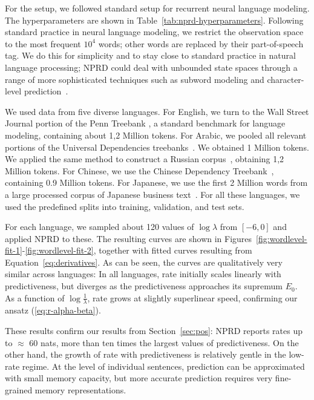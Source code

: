 \documentclass[11pt,letterpaper]{article}
\begin{document}
For the setup, we followed standard setup for recurrent neural language modeling.
The hyperparameters are shown in Table~\ref{tab:nprd-hyperparameters}.
Following standard practice in neural language modeling, we restrict the observation space to the most frequent $10^4$ words; other words are replaced by their part-of-speech tag.
We do this for simplicity and to stay close to standard practice in natural language processing; NPRD could deal with unbounded state spaces through a range of more sophisticated techniques such as subword modeling and character-level prediction~\citep{kim2016character, luong2016achieving}.


We used data from five diverse languages.
For English, we turn to the Wall Street Journal portion of the Penn Treebank \citep{marcus-building-1993}, a standard benchmark for language modeling, containing about 1,2 Million tokens.
For Arabic, we pooled all relevant portions of the Universal Dependencies treebanks~\citep{nivre-universal-2016,maamouri2004penn, hajic2004prague}. We obtained 1 Million tokens.
We applied the same method to construct a Russian corpus~\citep{syntagrus}, obtaining 1,2 Million tokens.
For Chinese, we use the Chinese Dependency Treebank~\citep{che2012chinese}, containing 0.9 Million tokens.
For Japanese, we use the first 2 Million words from a large processed corpus of Japanese business text~\citep{graff1995japanese}.
For all these languages, we used the predefined splits into training, validation, and test sets.

For each language, we sampled about 120 values of $\log \lambda$ from $[-6, 0]$ and applied NPRD to these.
The resulting curves are shown in Figures~\ref{fig:wordlevel-fit-1}-\ref{fig:wordlevel-fit-2}, together with fitted curves resulting from Equation~\ref{eq:derivatives}.
As can be seen, the curves are qualitatively very similar across languages:
In all languages, rate initially scales linearly with predictiveness, but diverges as the predictiveness approaches its supremum $E_0$.
As a function of $\log \frac{1}{\lambda}$, rate grows at slightly superlinear speed, confirming our ansatz (\ref{eq:r-alpha-beta}).

These results confirm our results from Section~\ref{sec:pos}:
NPRD reports rates up to $\approx$ 60 nats, more than ten times the largest values of predictiveness.
On the other hand, the growth of rate with predictiveness is relatively gentle in the low-rate regime.
At the level of individual sentences, prediction can be approximated with small memory capacity, but more accurate prediction requires very fine-grained memory representations.
\end{document}
